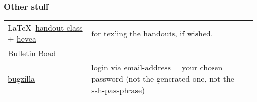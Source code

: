 \subsubsection*{Other stuff}

\begin{tabular}{lp{8cm}}
 \LaTeX\ \href{misc/handout.cls}{handout class}  +
 \href{misc/hevea.sty}{hevea} & for tex'ing the handouts, if wished.
 \\
 \href{http://snert.informatik.uni-kiel.de:8080/~swprakt/phpBB2/}{Bulletin Boad}  
 \\
 \href{http://snert.informatik.uni-kiel.de:8080/~swprakt/bugzilla}{bugzilla}  
 &
 login via email-address + your chosen password (not the generated one, not the ssh-passphrase)
\end{tabular}





